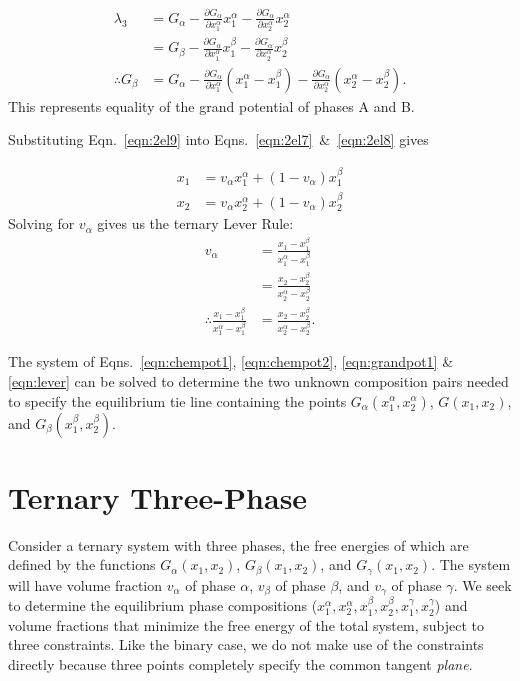 \documentclass[10pt]{article}
\begin{document}
\begin{align}
  \nonumber
  \lambda_3 &= G_{\alpha}
             - \frac{\partial G_{\alpha}}{\partial x_1^{\alpha}} x_1^{\alpha}
             - \frac{\partial G_{\alpha}}{\partial x_2^{\alpha}} x_2^{\alpha}\\
             &= G_{\beta}
             - \frac{\partial G_{\alpha}}{\partial x_1^{\alpha}} x_1^{\beta}
             - \frac{\partial G_{\alpha}}{\partial x_2^{\alpha}} x_2^{\beta}\\
  \label{eqn:grandpot1}
  \therefore
  G_{\beta} &= G_{\alpha}
             - \frac{\partial G_{\alpha}}{\partial x_1^{\alpha}}(x_1^{\alpha} - x_1^{\beta})
             - \frac{\partial G_{\alpha}}{\partial x_2^{\alpha}}(x_2^{\alpha} - x_2^{\beta}).
\end{align}
This represents equality of the grand potential of phases A and B.

Substituting Eqn.~\ref{eqn:2el9} into Eqns.~\ref{eqn:2el7}~\&~\ref{eqn:2el8}
gives

\begin{align}
  x_1 &= v_{\alpha} x_1^{\alpha} + (1 - v_{\alpha}) x_1^{\beta}\\
  x_2 &= v_{\alpha} x_2^{\alpha} + (1 - v_{\alpha}) x_2^{\beta}
\end{align}
Solving for $v_{\alpha}$ gives us the ternary Lever Rule:
\begin{align}
  \nonumber
  v_{\alpha} &= \frac{x_1 - x_1^{\beta}}{x_1^{\alpha} - x_1^{\beta}}\\
             &= \frac{x_2 - x_2^{\beta}}{x_2^{\alpha} - x_2^{\beta}}\\
  \label{eqn:lever}
  \therefore \frac{x_1 - x_1^{\beta}}{x_1^{\alpha} - x_1^{\beta}}
          &= \frac{x_2 - x_2^{\beta}}{x_2^{\alpha} - x_2^{\beta}}.
\end{align}

The system of Eqns.~\ref{eqn:chempot1}, \ref{eqn:chempot2}, \ref{eqn:grandpot1}
\& \ref{eqn:lever} can be solved to determine the two unknown composition pairs
needed to specify the equilibrium tie line containing the points
$G_{\alpha}(x_1^{\alpha},x_2^{\alpha})$, $G(x_1,x_2)$, and
$G_{\beta}(x_1^{\beta},x_2^{\beta})$.

\newpage
\section*{Ternary Three-Phase}

Consider a ternary system with three phases, the free energies of which are
defined by the functions $G_{\alpha}(x_1, x_2)$, $G_{\beta}(x_1, x_2)$, and
$G_{\gamma}(x_1, x_2)$. The system will have volume fraction $v_{\alpha}$ of
phase $\alpha$, $v_{\beta}$ of phase $\beta$, and $v_{\gamma}$ of phase
$\gamma$. We seek to determine the equilibrium phase compositions
($x_1^{\alpha}, x_2^{\alpha}, x_1^{\beta}, x_2^{\beta}, x_1^{\gamma},
x_2^{\gamma}$) and volume fractions that minimize the free energy of the total
system, subject to three constraints. Like the binary case, we do not make use
of the constraints directly because three points completely specify the common
tangent \emph{plane}.
\end{document}
